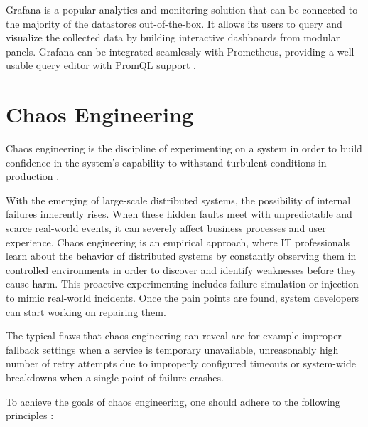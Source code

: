 Grafana is a popular analytics and monitoring solution that can be connected to the majority of the datastores out-of-the-box. It allows its users to query and visualize the collected data by building interactive dashboards from modular panels. Grafana can be integrated seamlessly with Prometheus, providing a well usable query editor with PromQL support \cite{Grafana}.


\section{Chaos Engineering} \label{backgroun-chaos-eng}

Chaos engineering is the discipline of experimenting on a system in order to build confidence in the system’s capability to withstand turbulent conditions in production \cite{PrinciplesOfChaos}.

With the emerging of large-scale distributed systems, the possibility of internal failures inherently rises. When these hidden faults meet with unpredictable and scarce real-world events, it can severely affect business processes and user experience. Chaos engineering is an empirical approach, where IT professionals learn about the behavior of distributed systems by constantly observing them in controlled environments in order to discover and identify weaknesses before they cause harm. This proactive experimenting includes failure simulation or injection to mimic real-world incidents. Once the pain points are found, system developers can start working on repairing them.

The typical flaws that chaos engineering can reveal are for example improper fallback settings when a service is temporary unavailable, unreasonably high number of retry attempts due to improperly configured timeouts or system-wide breakdowns when a single point of failure crashes.

To achieve the goals of chaos engineering, one should adhere to the following principles \cite{PrinciplesOfChaos}:

